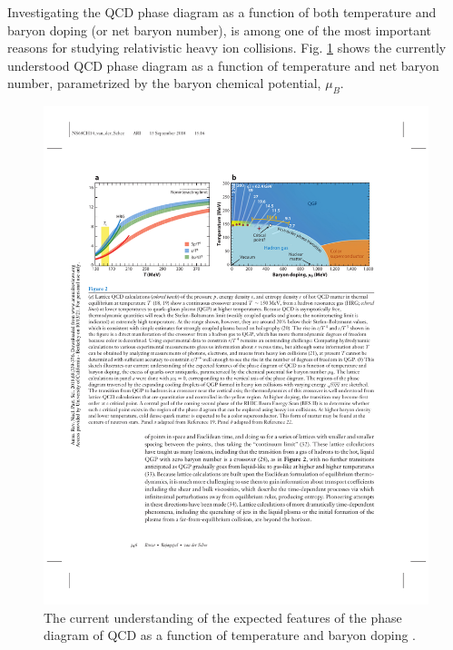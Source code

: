 Investigating the QCD phase diagram as a function of both temperature and baryon doping (or net baryon number), is among one of the most important reasons for studying relativistic heavy ion collisions. Fig. \ref{fig:qcd_phase} shows the currently understood QCD phase diagram as a function of temperature and net baryon number, parametrized by the baryon chemical potential, $\mu_B$.

\begin{figure}[htpb]
  \centering
  \includegraphics[width=.99\textwidth]{Introduction/qcd_phase.pdf}
  \caption{The current understanding of the expected features of the phase diagram of QCD as a function of temperature and baryon doping \cite{annurev-nucl}.}
\label{fig:qcd_phase}
\end{figure}

